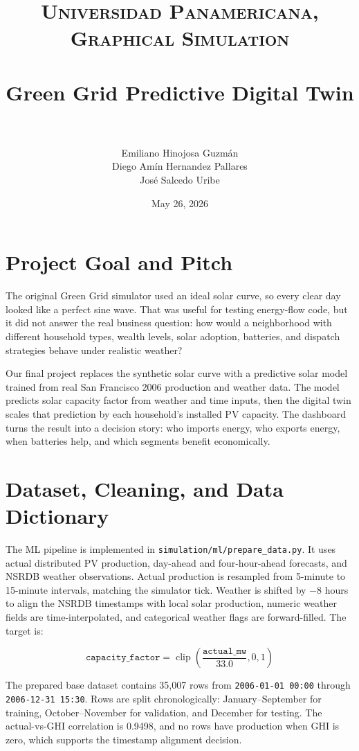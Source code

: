 \documentclass[paper=a4, fontsize=11pt]{scrartcl}
\title{
\normalfont \normalsize
\textsc{Universidad Panamericana, Graphical Simulation} \\ [20pt]
\horrule{0.5pt} \\[0.35cm]
\huge Green Grid Predictive Digital Twin \\
\horrule{2pt} \\[0.45cm]
}
\author{Emiliano Hinojosa Guzm\'an \\ Diego Am\'in Hernandez Pallares \\ Jos\'e Salcedo Uribe}
\date{\normalsize May 26, 2026}
\begin{document}
\maketitle

\section{Project Goal and Pitch}

The original Green Grid simulator used an ideal solar curve, so every clear day
looked like a perfect sine wave. That was useful for testing energy-flow code,
but it did not answer the real business question: how would a neighborhood with
different household types, wealth levels, solar adoption, batteries, and
dispatch strategies behave under realistic weather?

Our final project replaces the synthetic solar curve with a predictive solar
model trained from real San Francisco 2006 production and weather data. The
model predicts solar capacity factor from weather and time inputs, then the
digital twin scales that prediction by each household's installed PV capacity.
The dashboard turns the result into a decision story: who imports energy, who
exports energy, when batteries help, and which segments benefit economically.

\section{Dataset, Cleaning, and Data Dictionary}

The ML pipeline is implemented in \texttt{simulation/ml/prepare\_data.py}. It
uses actual distributed PV production, day-ahead and four-hour-ahead forecasts,
and NSRDB weather observations. Actual production is resampled from 5-minute to
15-minute intervals, matching the simulator tick. Weather is shifted by
\(-8\) hours to align the NSRDB timestamps with local solar production, numeric
weather fields are time-interpolated, and categorical weather flags are
forward-filled. The target is:

\[
\texttt{capacity\_factor} =
\operatorname{clip}\left(\frac{\texttt{actual\_mw}}{33.0}, 0, 1\right)
\]

The prepared base dataset contains 35,007 rows from
\texttt{2006-01-01 00:00} through \texttt{2006-12-31 15:30}. Rows are split
chronologically: January--September for training, October--November for
validation, and December for testing. The actual-vs-GHI correlation is 0.9498,
and no rows have production when GHI is zero, which supports the timestamp
alignment decision.
\end{document}

